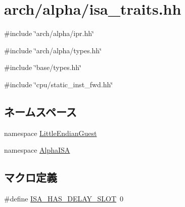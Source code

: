 \hypertarget{alpha_2isa__traits_8hh}{
\section{arch/alpha/isa\_\-traits.hh}
\label{alpha_2isa__traits_8hh}
}
{\ttfamily \#include \char`\"{}arch/alpha/ipr.hh\char`\"{}}\par
{\ttfamily \#include \char`\"{}arch/alpha/types.hh\char`\"{}}\par
{\ttfamily \#include \char`\"{}base/types.hh\char`\"{}}\par
{\ttfamily \#include \char`\"{}cpu/static\_\-inst\_\-fwd.hh\char`\"{}}\par
\subsection*{ネームスペース}
\begin{DoxyCompactItemize}
\item 
namespace \hyperlink{namespaceLittleEndianGuest}{LittleEndianGuest}
\item 
namespace \hyperlink{namespaceAlphaISA}{AlphaISA}
\end{DoxyCompactItemize}
\subsection*{マクロ定義}
\begin{DoxyCompactItemize}
\item 
\#define \hyperlink{alpha_2isa__traits_8hh_aae21ac6833454e7ead9810c372658afc}{ISA\_\-HAS\_\-DELAY\_\-SLOT}~0
\end{DoxyCompactItemize}
